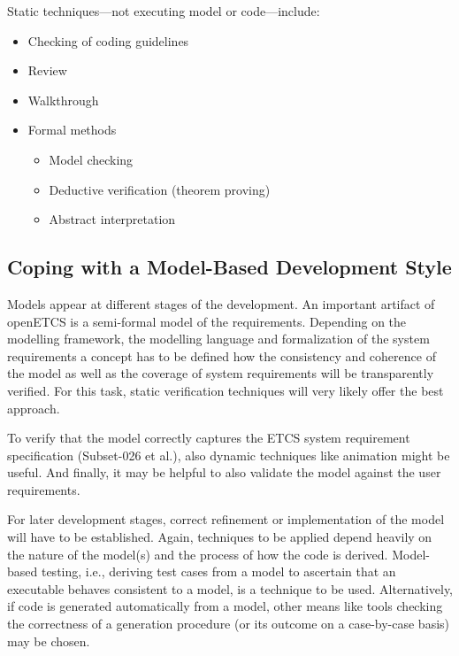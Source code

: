 Static \vv techniques---not executing model or code---include:
\begin{itemize}
\item Checking of coding guidelines
\item Review
\item Walkthrough
\item Formal methods
\begin{itemize}
\item Model checking
\item Deductive verification (theorem proving)
\item Abstract interpretation
\end{itemize}
\end{itemize}

%


\subsection*{Coping with a Model-Based Development Style}

Models appear at different stages of the development. An important
artifact of openETCS is a semi-formal model of the requirements. 
Depending on the modelling framework, the modelling language and
formalization of the system requirements a
concept has to be defined how the consistency and coherence of the
model as well as the coverage of system requirements will be
transparently verified. For this task, static verification techniques
will very likely offer the best approach.

To verify that the model correctly captures the ETCS system
requirement specification (Subset-026 et al.), also dynamic techniques
like animation might be useful. And finally, it may be helpful to also
validate the model against the user requirements.

For later development stages, correct refinement or implementation of
the model will have to be established. Again, techniques to be applied
depend heavily on the nature of the model(s) and the process of how
the code is derived. Model-based testing, i.e., deriving test cases
from a model to ascertain that an executable behaves consistent to a
model, is a technique to be used. Alternatively, if code is generated
automatically from a model, other means like tools checking the
correctness of a generation procedure (or its outcome on a
case-by-case basis) may be chosen.

